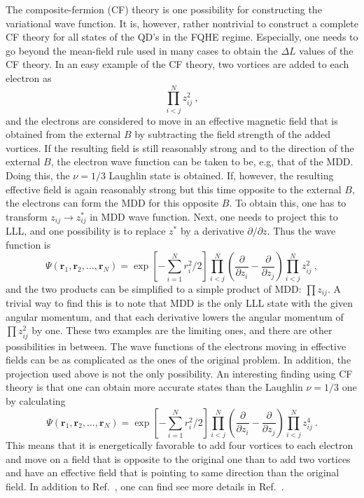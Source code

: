 \documentclass{article}
\begin{document}
The composite-fermion (CF) theory is one possibility for constructing
the variational wave function\cite{jain97,SamiDI}. It is, however,
rather nontrivial to construct a complete CF theory for all states of
the QD's in the FQHE regime.  Especially, one needs to go beyond the
mean-field rule used in many cases to obtain the $\Delta L$ values of
the CF theory\cite{beyondMDD}.  In an easy example of the CF theory,
two vortices are added to each electron as
\begin{equation}
\prod_{i<j}^N z_{ij}^2 \ ,
\end{equation}
and the electrons are considered to move in an effective magnetic
field that is obtained from the external $B$ by subtracting the field
strength of the added vortices. If the resulting field is still
reasonably strong and to the direction of the external $B$, the
electron wave function can be taken to be, e.g, that of the MDD. Doing
this, the $\nu=1/3$ Laughlin state is obtained. If, however, the
resulting effective field is again reasonably strong but this time
opposite to the external $B$, the electrons can form the MDD for this
opposite $B$. To obtain this, one has to transform $z_{ij} \to
z_{ij}^*$ in MDD wave function. Next, one needs to project this to
LLL, and one possibility is to replace $z^*$ by a derivative $\partial
/ \partial z$. Thus the wave function is
\begin{equation}
\Psi(\mathbf{r}_1,\mathbf{r}_2,\dots,\mathbf{r}_N) =
\exp\left[-\sum_{i=1}^N r_i^2/2\right] 
\prod_{i<j}^N 
\left(
\frac{\partial}{\partial z_{i}}-
\frac{\partial}{\partial z_{j}} 
\right)
\prod_{i<j}^N z_{ij}^2 \ ,
\end{equation}
and the two products can be simplified to a simple product of MDD:
$\prod z_{ij}$. A trivial way to find this is to note that MDD is
the only LLL state with the given angular momentum, and that each
derivative lowers the angular momentum of $\prod z_{ij}^2$ by one.
These two examples are the limiting ones, and there are other
possibilities in between\cite{SamiDI}. The wave functions of the
electrons moving in effective fields can be as complicated as the ones
of the original problem. In addition, the projection used above is not
the only possibility. An interesting finding using CF theory is that
one can obtain more accurate states than the Laughlin $\nu=1/3$ one by
calculating
\begin{equation}
\Psi(\mathbf{r}_1,\mathbf{r}_2,\dots,\mathbf{r}_N) =
\exp\left[-\sum_{i=1}^N r_i^2/2\right] 
\prod_{i<j}^N 
\left(
\frac{\partial}{\partial z_{i}}-
\frac{\partial}{\partial z_{j}} 
\right)
\prod_{i<j}^N z_{ij}^4 \ .
\end{equation}
This means that it is energetically favorable to add four vortices to
each electron and move on a field that is opposite to the original one
than to add two vortices and have an effective field that is pointing
to same direction than the original field.
%
In addition to Ref.~, one can find see more
details in Ref.~.
\end{document}
